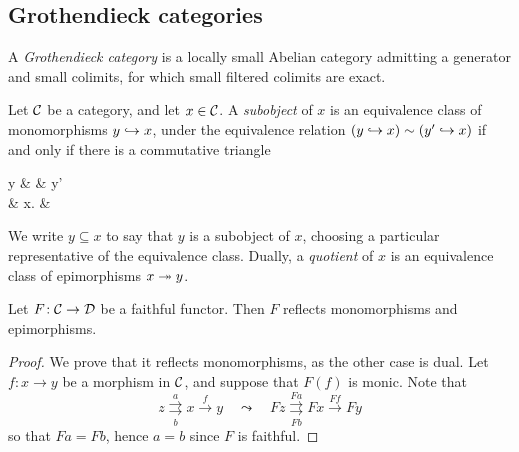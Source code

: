 \subsection{Grothendieck categories}
\begin{definition}
	A \emph{Grothendieck category} is a locally small Abelian category admitting a generator and small colimits, for which small filtered colimits are exact.
\end{definition}

\begin{definition}
	Let \(\mathcal{C}\) be a category, and let \(x\in\mathcal{C}\). A \emph{subobject} of \(x\) is an equivalence class of monomorphisms \(y\hookrightarrow x\), under the equivalence
	relation \((y\hookrightarrow x)\sim (y'\hookrightarrow x)\) if and only if there is a commutative triangle
	\begin{diagram*}[cramped, column sep=small]
		y \ar[rr,"\sim"]\ar[dr,hook] & & y'\ar[dl,hook] \\
		& x. &
	\end{diagram*}
	We write \(y\subseteq x\) to say that \(y\) is a subobject of \(x\), choosing a particular representative of the equivalence class. Dually, a \emph{quotient} of \(x\) is an equivalence class of epimorphisms \(x\twoheadrightarrow y\).
\end{definition}

\begin{lemma}\label{lemma:faithful-functors-reflects-monomorphisms-epimorphisms}
	Let \(F\!:\mathcal{C}\to\mathcal{D}\) be a faithful functor. Then \(F\) reflects monomorphisms and epimorphisms.
\end{lemma}
\begin{proof}
We prove that it reflects monomorphisms, as the other case is dual. Let \(f\!:x\to y\) be a morphism in \(\mathcal{C}\), and suppose that \(F(f)\) is monic. Note that
\[ z \underset{b}{\overset{a}{\rightrightarrows}} x \overset{f}\to y \quad\leadsto\quad Fz \underset{Fb}{\overset{Fa}{\rightrightarrows}} Fx \overset{Ff}\to Fy \]
so that \(Fa = Fb\), hence \(a=b\) since \(F\) is faithful.
\end{proof}

